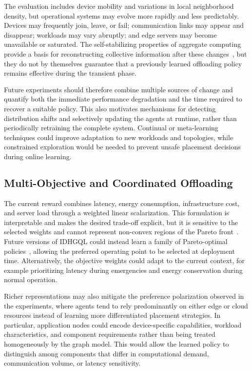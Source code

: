 The evaluation includes device mobility and variations in local neighborhood
density, but operational systems may evolve more rapidly and less predictably.
Devices may frequently join, leave, or fail; communication links may appear and
disappear; workloads may vary abruptly; and edge servers may become unavailable
or saturated.
The self-stabilizing properties of aggregate computing provide a basis for
reconstructing collective information after these
changes~\cite{DBLP:journals/tocl/AudritoVDPB19}, but they do not by themselves guarantee
that a previously learned offloading policy remains effective during the
transient phase.

Future experiments should therefore combine multiple sources of change and
quantify both the immediate performance degradation and the time required to
recover a suitable policy.
This also motivates mechanisms for detecting distribution shifts and selectively
updating the agents at runtime, rather than periodically retraining the complete
system.
Continual or meta-learning techniques could improve adaptation to new workloads
and topologies, while constrained exploration would be needed to prevent unsafe
placement decisions during online learning.

\subsection{Multi-Objective and Coordinated Offloading}

The current reward combines latency, energy consumption, infrastructure cost,
and server load through a weighted linear scalarization.
This formulation is interpretable and makes the desired trade-off explicit, but
it is sensitive to the selected weights and cannot represent non-convex regions
of the Pareto front~\cite{Hayes2022}.
Future versions of IDHGQL could instead learn a family of Pareto-optimal
policies~\cite{navon2021learning}, allowing the preferred operating point to be selected
at deployment time.
Alternatively, the objective weights could adapt to the current context, for
example prioritizing latency during emergencies and energy conservation during
normal operation.

Richer representations may also mitigate the preference polarization observed in
the experiments, where agents tend to rely predominantly on either edge or cloud
resources instead of learning more differentiated placement strategies.
In particular, application nodes could encode device-specific capabilities,
workload characteristics, and component requirements rather than being treated
homogeneously by the graph model.
This would allow the learned policy to distinguish among components that differ
in computational demand, communication volume, or latency sensitivity.

